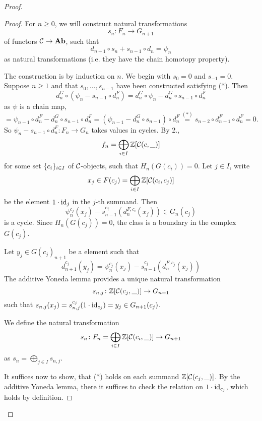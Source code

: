 \documentclass[language=english]{TemplateLecture}
\begin{document}
\begin{proof}

    \begin{proof}
        For \(n \geq 0\), we will construct natural transformations
        \[s_n\colon F_n \to G_{n+1}\]
        of functors \(\mathcal{C} \to \mathbf{Ab}\), such that
        \begin{equation}\tag{*}
            d_{n+1} \circ s_n + s_{n-1} \circ d_n = \psi_n
        \end{equation}
        as natural transformations (i.e. they have the chain homotopy property).

        The construction is by induction on \(n.\) We begin with \(s_0 = 0\) and \(s_{-1} = 0\). Suppose \(n \geq 1\) and that \(s_0, \dots, s_{n-1}\) have been constructed satisfying (*). Then
        \[d_n^G \circ (\psi_n - s_{n-1} \circ d_n^F) = d_n^G \circ \psi_n - d_n^G \circ s_{n-1} \circ d_n^F\]
        as \(\psi\) is a chain map,
        \[= \psi_{n-1} \circ d_n^F - d_n^G \circ s_{n-1} \circ d_n^F = (\psi_{n-1} - d_n^G \circ s_{n-1}) \circ d_n^F \overset{(*)}{=} s_{n-2} \circ d_{n-1}^F \circ d_n^F = 0.\]
        So \(\psi_n - s_{n-1} \circ d_n^F\colon F_n \to G_n\) takes values in cycles.
        By 2.,
        \[f_n = \bigoplus_{i \in I} \mathbb{Z}[\mathcal{C}(c, \_)]\]
        for some set \(\{c_i\}_{i \in I}\) of \(\mathcal{C}\)-objects, such that \(H_n(G(c_i)) = 0\). Let \(j \in I\), write
        \[x_j \in F(c_j) = \bigoplus_{i \in I} \mathbb{Z}[\mathcal{C}(c_i,c_j)]\]
        be the element \(1 \cdot \operatorname{id}_j\) in the \(j\)-th summand. Then
        \[\psi_n^{c_j}(x_j) - s_{n-1}^{{c_j}}(d_n^{F, c_i}(x_j)) \in G_n(c_j)\]
        is a cycle. Since \(H_n(G(c_j)) = 0\), the class is a boundary in the complex \(G(c_j)\).

        Let \(y_j \in G(c_j)_{n+1}\) be a element such that
        \[d_{n+1}^{c_j}(y_j) = \psi_n^{c_j}(x_j) - s_{n-1}^{c_j}(d_n^{F, c_j}(x_j))\]
        The additive Yoneda lemma provides a unique natural transformation
        \[s_{n,j} \colon \mathbb{Z}[\mathcal{C}(c_j, \_)] \to G_{n+1}\]
        such that \(s_{n,j}(x_j) = s_{n,j}^{c_j}(1\cdot \operatorname{id}_{c_j}) = y_j \in G_{n+1}(c_j)\).

        We define the natural transformation
        \[s_n\colon F_n = \bigoplus_{i \in I} \mathbb{Z}[\mathcal{C}(c_i, \_)] \to G_{n+1}\]
        as \(s_n = \bigoplus_{j \in I} s_{n,j}\).

        It suffices now to show, that (*) holds on each summand \(\mathbb{Z}[\mathcal{C}(c_j, \_)]\). By the additive Yoneda lemma, there it suffices to check the relation on \(1\cdot \operatorname{id}_{c_j}\), which holds by definition.
    \end{proof}


\end{proof}
\end{document}
